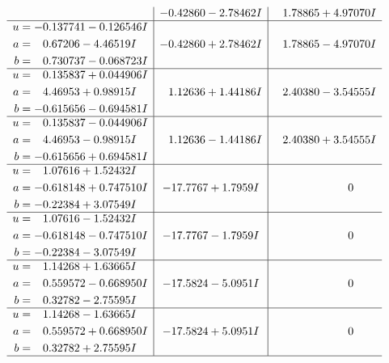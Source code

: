\documentclass[1p]{elsarticle_modified}
\theoremstyle{definition}
\begin{document}
$$\begin{array}{c|c|c}
 & -0.42860 - 2.78462 I & \phantom{-}1.78865 + 4.97070 I \\ \hline\begin{aligned}
u &= -0.137741 - 0.126546 I \\
a &= \phantom{-}0.67206 - 4.46519 I \\
b &= \phantom{-}0.730737 - 0.068723 I\end{aligned}
 & -0.42860 + 2.78462 I & \phantom{-}1.78865 - 4.97070 I \\ \hline\begin{aligned}
u &= \phantom{-}0.135837 + 0.044906 I \\
a &= \phantom{-}4.46953 + 0.98915 I \\
b &= -0.615656 - 0.694581 I\end{aligned}
 & \phantom{-}1.12636 + 1.44186 I & \phantom{-}2.40380 - 3.54555 I \\ \hline\begin{aligned}
u &= \phantom{-}0.135837 - 0.044906 I \\
a &= \phantom{-}4.46953 - 0.98915 I \\
b &= -0.615656 + 0.694581 I\end{aligned}
 & \phantom{-}1.12636 - 1.44186 I & \phantom{-}2.40380 + 3.54555 I \\ \hline\begin{aligned}
u &= \phantom{-}1.07616 + 1.52432 I \\
a &= -0.618148 + 0.747510 I \\
b &= -0.22384 + 3.07549 I\end{aligned}
 & -17.7767 + 1.7959 I & \phantom{-0.000000 } 0 \\ \hline\begin{aligned}
u &= \phantom{-}1.07616 - 1.52432 I \\
a &= -0.618148 - 0.747510 I \\
b &= -0.22384 - 3.07549 I\end{aligned}
 & -17.7767 - 1.7959 I & \phantom{-0.000000 } 0 \\ \hline\begin{aligned}
u &= \phantom{-}1.14268 + 1.63665 I \\
a &= \phantom{-}0.559572 - 0.668950 I \\
b &= \phantom{-}0.32782 - 2.75595 I\end{aligned}
 & -17.5824 - 5.0951 I & \phantom{-0.000000 } 0 \\ \hline\begin{aligned}
u &= \phantom{-}1.14268 - 1.63665 I \\
a &= \phantom{-}0.559572 + 0.668950 I \\
b &= \phantom{-}0.32782 + 2.75595 I\end{aligned}
 & -17.5824 + 5.0951 I & \phantom{-0.000000 } 0\\
 \hline 
 \end{array}$$\newpage\newpage\renewcommand{\arraystretch}{1}
\end{document}
